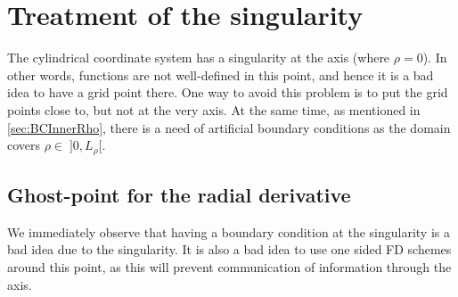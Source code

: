 \section{Treatment of the singularity}
\label{sec:innerCenter}
The cylindrical coordinate system has a singularity at the axis (where $\rho=0$).
In other words, functions are not well-defined in this point, and hence it is a bad idea to have a grid point there.
One way to avoid this problem is to put the grid points close to, but not at the very axis.
At the same time, as mentioned in \cref{sec:BCInnerRho}, there is a need of artificial boundary conditions as the domain covers $\rho \in \;]0, L_\rho[$.

\subsection{Ghost-point for the radial derivative}
\label{sec:ghostRhoDeriv}
We immediately observe that having a boundary condition at the singularity is a bad idea due to the singularity.
It is also a bad idea to use one sided FD schemes around this point, as this will prevent communication of information through the axis.

